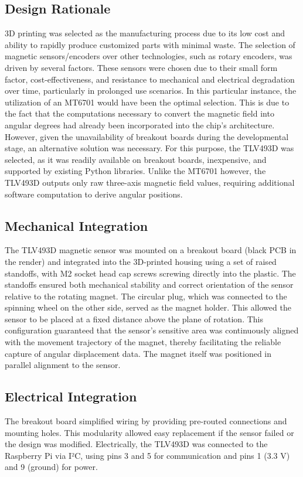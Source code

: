	\subsection{Design Rationale}
	3D printing was selected as the manufacturing process due to its low cost and ability to rapidly produce customized parts with minimal waste.
	The selection of magnetic sensors/encoders over other technologies, such as rotary encoders, was driven by several factors. These sensors were chosen due to their small form factor, cost-effectiveness, and resistance to mechanical and electrical degradation over time, particularly in prolonged use scenarios. In this particular instance, the utilization of an MT6701 would have been the optimal selection. This is due to the fact that the computations necessary to convert the magnetic field into angular degrees had already been incorporated into the chip's architecture. However, given the unavailability of breakout boards during the developmental stage, an alternative solution was necessary. For this purpose, the TLV493D was selected, as it was readily available on breakout boards, inexpensive, and supported by existing Python libraries. Unlike the MT6701 however, the TLV493D outputs only raw three-axis magnetic field values, requiring additional software computation to derive angular positions.
	
	\subsection{Mechanical Integration}
	The TLV493D magnetic sensor was mounted on a breakout board (black PCB in the render) and integrated into the 3D-printed housing using a set of raised standoffs, with M2 socket head cap screws screwing directly into the plastic. The standoffs ensured both mechanical stability and correct orientation of the sensor relative to the rotating magnet. The circular plug, which was connected to the spinning wheel on the other side, served as the magnet holder. This allowed the sensor to be placed at a fixed distance above the plane of rotation. This configuration guaranteed that the sensor's sensitive area was continuously aligned with the movement trajectory of the magnet, thereby facilitating the reliable capture of angular displacement data. The magnet itself was positioned in parallel alignment to the sensor.\\
	
	\subsection{Electrical Integration}
	The breakout board simplified wiring by providing pre-routed connections and mounting holes. This modularity allowed easy replacement if the sensor failed or the design was modified. Electrically, the TLV493D was connected to the Raspberry Pi via I²C, using pins 3 and 5 for communication and pins 1 (3.3 V) and 9 (ground) for power.
		
